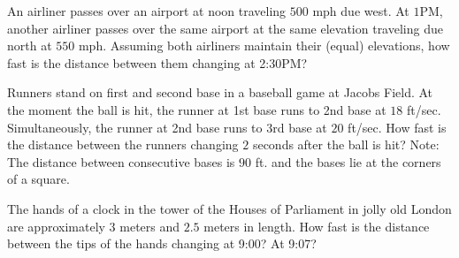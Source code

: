 \documentclass[handout]{ximera}
\begin{document}
 
\begin{exercise} 
An airliner passes over an airport at noon traveling $500$ mph due west.  At $1$PM, another airliner passes over the same airport at the same elevation traveling due north at $550$ mph.  Assuming both airliners maintain their (equal) elevations, how fast is the distance between them changing at 2:30PM?
\end{exercise}
\begin{exercise} 
Runners stand on first and second base in a baseball game at Jacobs Field.  At the moment the ball is hit, the runner at 1st base runs to 2nd base at $18$ ft/sec.  Simultaneously, the runner at 2nd base runs to 3rd base at $20$ ft/sec. How fast is the distance between the runners changing $2$ seconds after the ball is hit?  Note:  The distance between consecutive bases is $90$ ft. and the bases lie at the corners of a square.
\end{exercise}
\begin{exercise} 
The hands of a clock in the tower of the Houses of Parliament in jolly old London are approximately $3$ meters and $2.5$ meters in length.  How fast is the distance between the tips of the hands changing at 9:00?  At 9:07?
\end{exercise}
\end{document}
